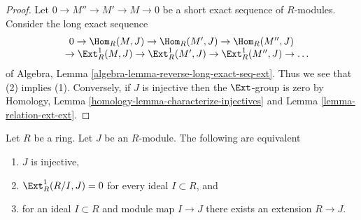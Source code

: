 \begin{proof}
Let $0 \to M'' \to M' \to M \to 0$ be a short exact sequence of $R$-modules.
Consider the long exact sequence
$$
\begin{matrix}
0
\to \Hom_R(M, J)
\to \Hom_R(M', J)
\to \Hom_R(M'', J)
\\
\phantom{0\ }
\to \Ext^1_R(M, J)
\to \Ext^1_R(M', J)
\to \Ext^1_R(M'', J)
\to \ldots
\end{matrix}
$$
of Algebra, Lemma \ref{algebra-lemma-reverse-long-exact-seq-ext}.
Thus we see that (2) implies (1). Conversely, if $J$ is injective
then the $\Ext$-group is zero by
Homology, Lemma \ref{homology-lemma-characterize-injectives} and
Lemma \ref{lemma-relation-ext-ext}.
\end{proof}

\begin{lemma}
\label{lemma-characterize-injective-bis}
Let $R$ be a ring. Let $J$ be an $R$-module.
The following are equivalent
\begin{enumerate}
\item $J$ is injective,
\item $\Ext^1_R(R/I, J) = 0$ for every ideal $I \subset R$, and
\item for an ideal $I \subset R$ and module map $I \to J$
there exists an extension $R \to J$.
\end{enumerate}
\end{lemma}

